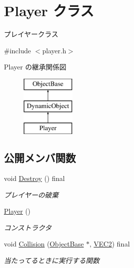 \hypertarget{class_player}{}\section{Player クラス}
\label{class_player}


プレイヤークラス  




{\ttfamily \#include $<$player.\+h$>$}

Player の継承関係図\begin{figure}[H]
\begin{center}
\leavevmode
\includegraphics[height=3.000000cm]{class_player}
\end{center}
\end{figure}
\subsection*{公開メンバ関数}
\begin{DoxyCompactItemize}
\item 
void \mbox{\hyperlink{class_player_af2cf4936165ef12cce96f7994e0879df}{Destroy}} () final
\begin{DoxyCompactList}\small\item\em プレイヤーの破棄 \end{DoxyCompactList}\item 
\mbox{\hyperlink{class_player_affe0cc3cb714f6deb4e62f0c0d3f1fd8}{Player}} ()
\begin{DoxyCompactList}\small\item\em コンストラクタ \end{DoxyCompactList}\item 
void \mbox{\hyperlink{class_player_a184fbb2c70e34fb6c6a0c2fc7e0f86c9}{Collision}} (\mbox{\hyperlink{class_object_base}{Object\+Base}} $\ast$, \mbox{\hyperlink{transform_8h_afb0c5e21d4133ff4f200992c0b534e1b}{V\+E\+C2}}) final
\begin{DoxyCompactList}\small\item\em 当たってるときに実行する関数 \end{DoxyCompactList}\end{DoxyCompactItemize}

